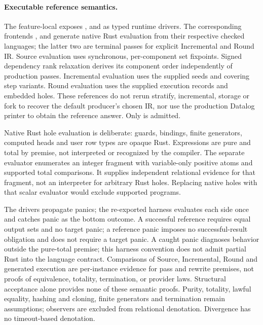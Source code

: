 \paragraph{Executable reference semantics.}
The feature-local  exposes ,
 and  as typed runtime drivers.
The corresponding  frontends
,  and 
generate native Rust evaluation from their respective checked languages;
the latter two are terminal passes for explicit Incremental and Round IR.
Source evaluation uses synchronous, per-component set fixpoints. Signed dependency
rank relaxation derives its component order independently of production passes.
Incremental evaluation uses the supplied seeds and covering step variants.
Round evaluation uses the supplied execution records and embedded holes.
These references do not rerun stratify, incremental, storage or fork to recover
the default producer's chosen IR, nor use the production Datalog printer to
obtain the reference answer. Only  is admitted.

Native Rust hole evaluation is deliberate: guards, bindings, finite generators,
computed heads and user row types are opaque Rust. Expressions are pure and
total by premise, not interpreted or recognized by the compiler.
The separate  evaluator enumerates an integer
fragment with variable-only positive atoms and supported total comparisons.
It supplies independent relational evidence for that fragment, not an interpreter
for arbitrary Rust holes. Replacing native holes with that scalar evaluator would
exclude supported programs.

The drivers propagate panics; the re-exported  harness
evaluates each side once and catches panic as the bottom outcome.
A successful reference requires equal output sets and no target panic; a reference
panic imposes no successful-result obligation and does not require a target panic.
A caught panic diagnoses behavior outside the pure-total premise; this harness
convention does not admit partial Rust into the language contract.
Comparisons of Source, Incremental, Round and generated execution are per-instance
evidence for pass and rewrite premises, not proofs of equivalence, totality,
termination, or provider laws. Structural acceptance alone provides none of these
semantic proofs. Purity, totality, lawful equality, hashing and cloning, finite
generators and termination remain assumptions; observers are excluded from relational
denotation. Divergence has no timeout-based denotation.


